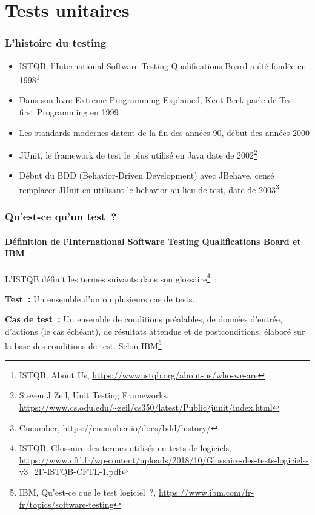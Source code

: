\documentclass{beamer}
\begin{document}
    \section{Tests unitaires}

    \begin{frame}
        \transdissolve
        \frametitle{L'histoire du testing}

        \begin{itemize}

            \item ISTQB, l'International Software Testing Qualifications Board a été fondée en 1998\footnote{ISTQB, About Us, \url{https://www.istqb.org/about-us/who-we-are}}
            \item Dans son livre Extreme Programming Explained, Kent Beck parle de Test-first Programming en 1999
            \item Les standards modernes datent de la fin des années 90, début des années 2000
            \item JUnit, le framework de test le plus utilisé en Java date de 2002\footnote{Steven J Zeil, Unit Testing Frameworks, \url{https://www.cs.odu.edu/~zeil/cs350/latest/Public/junit/index.html}}
            \item Début du BDD (Behavior-Driven Development) avec JBehave, censé remplacer JUnit en utilisant le behavior au lieu de test, date de 2003\footnote{Cucumber, \url{https://cucumber.io/docs/bdd/history/}}
        \end{itemize}

    \end{frame}

    \begin{frame}
        \frametitle{Qu’est-ce qu’un test~?}
        \framesubtitle{Définition de l'International Software Testing Qualifications Board et IBM}
        \transdissolve
        L’ISTQB définit les termes suivants dans son glossaire\footnote{ISTQB, Glossaire des termes utilisés en tests de logiciels, \url{https://www.cftl.fr/wp-content/uploads/2018/10/Glossaire-des-tests-logiciels-v3_2F-ISTQB-CFTL-1.pdf}}~:

        \textbf{Test~:} Un ensemble d’un ou plusieurs cas
        de tests.

        \textbf{Cas de test~:} Un ensemble de conditions
        préalables, de données d'entrée, d'actions
        (le cas échéant), de résultats attendus et
        de postconditions, élaboré sur la base des
        conditions de test.
        \bigbreak
        Selon IBM\footnote{IBM, Qu'est-ce que le test logiciel~?, \url{https://www.ibm.com/fr-fr/topics/software-testing}}~:

    \end{frame}
\end{document}
